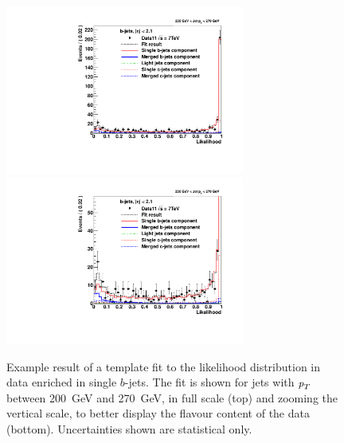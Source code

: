 \begin{figure}[tp]
\centering
\includegraphics[width=0.7\textwidth]{FIGS/Fits/LikelihoodFit_3param_ETAFull_DataEnriched2btag_Bin5.pdf}
\includegraphics[width=0.7\textwidth]{FIGS/Fits/LikelihoodFit_3param_ETAFull_DataEnriched2btagZOOM_Bin5.pdf}
\caption{Example result of a template fit to the likelihood distribution in data enriched in single $b$-jets. The fit is shown for jets with ${\emph{p}_{T}}$ between  200~GeV and 270~GeV, in full scale (top) and zooming the vertical scale, to better display the flavour content of the data (bottom). Uncertainties shown are statistical only.}
\label{fig:fitenriched2btag2}
\end{figure}




